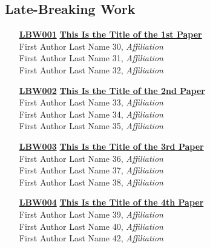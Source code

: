 \subsection{Late-Breaking Work}
\begin{enumerate}
\item[\href{https://doi.org/10.1145/1122445.1122456}{\textbf{LBW001}}]
\href{https://doi.org/10.1145/1122445.1122456}{\textbf{This Is the Title of the 1st Paper}}\\
First Author Last Name 30, \emph{Affiliation}\\
First Author Last Name 31, \emph{Affiliation}\\
First Author Last Name 32, \emph{Affiliation}\\

\item[\href{https://doi.org/10.1145/1122445.1122456}{\textbf{LBW002}}]
\href{https://doi.org/10.1145/1122445.1122456}{\textbf{This Is the Title of the 2nd Paper}}\\
First Author Last Name 33, \emph{Affiliation}\\
First Author Last Name 34, \emph{Affiliation}\\
First Author Last Name 35, \emph{Affiliation}\\

\item[\href{https://doi.org/10.1145/1122445.1122456}{\textbf{LBW003}}]
\href{https://doi.org/10.1145/1122445.1122456}{\textbf{This Is the Title of the 3rd Paper}}\\
First Author Last Name 36, \emph{Affiliation}\\
First Author Last Name 37, \emph{Affiliation}\\
First Author Last Name 38, \emph{Affiliation}\\

\item[\href{https://doi.org/10.1145/1122445.1122456}{\textbf{LBW004}}]
\href{https://doi.org/10.1145/1122445.1122456}{\textbf{This Is the Title of the 4th Paper}}\\
First Author Last Name 39, \emph{Affiliation}\\
First Author Last Name 40, \emph{Affiliation}\\
First Author Last Name 42, \emph{Affiliation}\\
\end{enumerate}


